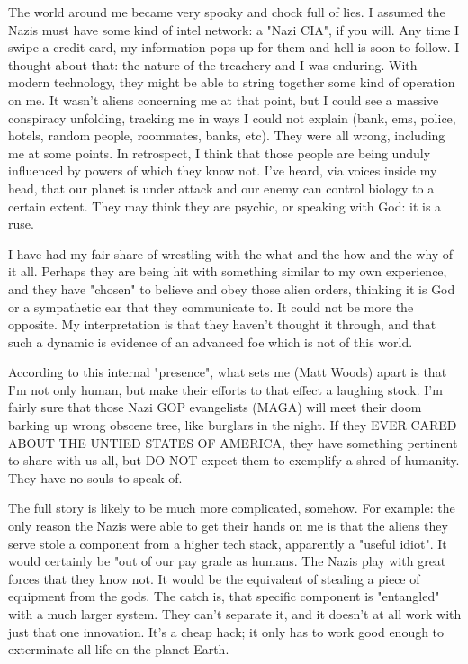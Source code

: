\documentclass{article}
\begin{document}
\begin{multicols}{2}
The world around me became very spooky and chock full of lies. I assumed the Nazis must have some kind of intel network: a "Nazi CIA", if you will. Any time I swipe a credit card, my information pops up for them and hell is soon to follow. I thought about that: the nature of the treachery and I was enduring. With modern technology, they might be able to string together some kind of operation on me. It wasn't aliens concerning me at that point, but I could see a massive conspiracy unfolding, tracking me in ways I could not explain (bank, ems, police, hotels, random people, roommates, banks, etc). They were all wrong, including me at some points. In retrospect, I think that those people are being unduly influenced by powers of which they know not. I've heard, via voices inside my head, that our planet is under attack and our enemy can control biology to a certain extent. They may think they are psychic, or speaking with God: it is a ruse. 

I have had my fair share of wrestling with the what and the how and the why of it all. Perhaps they are being hit with something similar to my own experience, and they have "chosen" to believe and obey those alien orders, thinking it is God or a sympathetic ear that they communicate to. It could not be more the opposite. My interpretation is that they haven't thought it through, and that such a dynamic is evidence of an advanced foe which is not of this world. 

According to this internal "presence", what sets me (Matt Woods) apart is that I'm not only human, but make their efforts to that effect a laughing stock. I'm fairly sure that those Nazi GOP evangelists (MAGA) will meet their doom barking up wrong obscene tree, like burglars in the night. If they EVER CARED ABOUT THE UNTIED STATES OF AMERICA, they have something pertinent to share with us all, but DO NOT expect them to exemplify a shred of humanity. They have no souls to speak of. 

The full story is likely to be much more complicated, somehow. For example: the only reason the Nazis were able to get their hands on me is that the aliens they serve stole a component from a higher tech stack, apparently a "useful idiot". It would certainly be "out of our pay grade as humans. The Nazis play with great forces that they know not. It would be the equivalent of stealing a piece of equipment from the gods. The catch is, that specific component is "entangled" with a much larger system. They can't separate it, and it doesn't at all work with just that one innovation. It's a cheap hack; it only has to work good enough to exterminate all life on the planet Earth.


\end{multicols}
\end{document}
